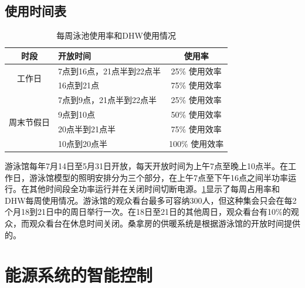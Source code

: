 \documentclass[hyperref]{ctexart}
\begin{document}
\begin{multicols}{2}
		\subsection{使用时间表}
		\begin{table}[H]
			\centering
			\caption{每周泳池使用率和DHW使用情况}
			\begin{tabular}{cp{6em}c}
				\toprule    
				时段 & 开放时间 & 使用率\\
				\midrule
				\multirow{2}{*}{工作日} & 7点到16点，21点半到22点半 & 25\% 使用效率\\
				~ & 16点到21点 & 75\% 使用效率\\
				\midrule
				\multirow{4}{*}{周末节假日} & 7点到9点，21点半到22点半 & 25\% 使用效率\\
				~ & 9点到10点 & 50\% 使用效率\\
				~ & 20点半到21点半 & 75\% 使用效率\\
				~ & 10点到20点半 & 100\% 使用效率\\
				\bottomrule  
			\end{tabular}
			\label{tab8}
		\end{table}
		游泳馆每年7月14日至5月31日开放，每天开放时间为上午7点至晚上10点半。在工作日，游泳馆模型的照明安排分为三个部分，在上午7点至下午16点之间半功率运行。在其他时间段全功率运行并在关闭时间切断电源。\cref{tab8}显示了每周占用率和DHW每周使用情况。游泳馆的观众看台最多可容纳300人，但这种集会只会在每2个月18到21日中的周日举行一次。在18日至21日的其他周日，观众看台有10\%的观众，而观众看台在休息时间关闭。桑拿房的供暖系统是根据游泳馆的开放时间提供的。
		\par
		\section{能源系统的智能控制}

\end{multicols}
\end{document}
